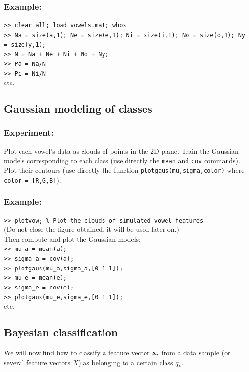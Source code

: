 \documentclass[a4paper]{article}
\newcommand{\mat}[1]{{\tt >> #1} \\}
\newcommand{\com}[1]{{\tt #1}}
\newcommand{\xv}{\ensuremath\mathbf{x}}  %
\begin{document}
\subsubsection{Example:}
\mat{clear all; load vowels.mat; whos}
\mat{Na = size(a,1); Ne = size(e,1); Ni = size(i,1); No = size(o,1); Ny = size(y,1);}
\mat{N = Na + Ne + Ni + No + Ny;}
\mat{Pa = Na/N}
\mat{Pi = Ni/N}
etc.


\subsection{Gaussian modeling of classes}
\label{gaussmod}

\subsubsection*{Experiment:}
Plot each vowel's data as clouds of points in the 2D plane. Train the
Gaussian models corresponding to each class (use directly the
\com{mean} and \com{cov} commands). Plot their contours (use directly
the function \com{plotgaus(mu,sigma,color)} where \com{color =
  [R,G,B]}).

\subsubsection{Example:}
\mat{plotvow; \% Plot the clouds of simulated vowel features}
(Do not close the figure obtained, it will be used later on.) \\
Then compute and plot the Gaussian models: \\
\mat{mu\_a = mean(a);}
\mat{sigma\_a = cov(a);}
\mat{plotgaus(mu\_a,sigma\_a,[0 1 1]);}
\mat{mu\_e = mean(e);}
\mat{sigma\_e = cov(e);}
\mat{plotgaus(mu\_e,sigma\_e,[0 1 1]);}
etc.


\subsection{Bayesian classification}
\label{sec:classification}

We will now find how to classify a feature vector $\xv_i$ from a data
sample (or several feature vectors $X$) as belonging to a certain
class $q_k$.
\end{document}
